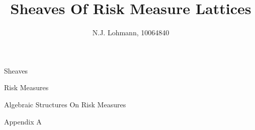 \documentclass[11pt,a4paper,twoside]{article}
\title{Sheaves Of Risk Measure Lattices}
\author{N.J. Lohmann, 10064840}
\theoremstyle{definition}
\theoremstyle{remark}
\theoremstyle{example}
\begin{document}
\maketitle

\newpage
\begin{section}{Sheaves}


\end{section}
\newpage
\begin{section}{Risk Measures}

\end{section}
\newpage
\begin{section}{Algebraic Structures On Risk Measures}




\end{section}
\newpage
\appendix
\begin{section}{Appendix A}
  
\end{section}

\end{document}
